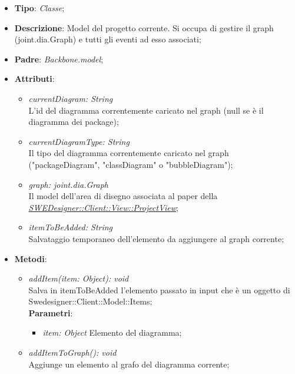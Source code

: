 \documentclass[../DefinizioneDiProdotto.tex]{subfiles}
\begin{document}
					\begin{itemize}
						\item \textbf{Tipo}: \emph{Classe};
						\item \textbf{Descrizione}: Model del progetto corrente. Si occupa di gestire il graph (joint.dia.Graph) e tutti gli eventi ad esso associati;
						\item \textbf{Padre}: \emph{Backbone.model};
						\item \textbf{Attributi}:
						\begin{itemize}
							\item \emph{currentDiagram: String} \\
							L'id del diagramma correntemente caricato nel graph (null se è il diagramma dei package); \\
							\item \emph{currentDiagramType: String} \\
							Il tipo del diagramma correntemente caricato nel graph ("packageDiagram", "classDiagram" o "bubbleDiagram"); \\
							\item \emph{graph: joint.dia.Graph} \\
							Il model dell'area di disegno associata al paper della \hyperlink{SWEDesigner::Client::View::ProjectView}{\emph{SWEDesigner::Client::View::ProjectView}}; \\
							\item \emph{itemToBeAdded: String} \\
							Salvataggio temporaneo dell'elemento da aggiungere al graph corrente; \\
						\end{itemize}
						\item \textbf{Metodi}:
						\begin{itemize}
							\item \emph{addItem(item: Object): void} \\
							Salva in itemToBeAdded l'elemento passato in input che è un oggetto di Swedesigner::Client::Model::Items; \\
								\textbf{Parametri}:
								\begin{itemize}
									\item \emph{item: Object}
									Elemento del diagramma; \\
								\end{itemize}
							\item \emph{addItemToGraph(): void} \\
							Aggiunge un elemento al grafo del diagramma corrente; \\

\end{itemize}
\end{itemize}
\end{document}
